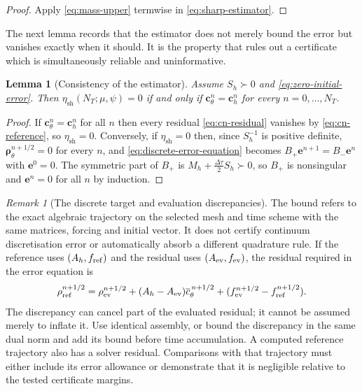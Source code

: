 \documentclass[11pt]{amsart}
\newtheorem{lemma}[theorem]{Lemma}
\theoremstyle{remark}
\newtheorem{remark}[theorem]{Remark}
\newcommand{\Mh}{M_h}
\newcommand{\Sh}{S_h}
\newcommand{\dt}{\Delta\tau}
\newcommand{\etaSharp}{\eta_{\mathrm{sh}}}
\newcommand{\ee}{\mathbf e}
\newcommand{\cc}{\mathbf c}
\newcommand{\rr}{\bm\rho}
\begin{document}
\begin{proof}
Apply \eqref{eq:mass-upper} termwise in \eqref{eq:sharp-estimator}.
\end{proof}

The next lemma records that the estimator does not merely bound the error but
vanishes exactly when it should.  It is the property that rules out a
certificate which is simultaneously reliable and uninformative.

\begin{lemma}[Consistency of the estimator]
\label{lem:consistency}
Assume $\Sh\succ0$ and \eqref{eq:zero-initial-error}. Then
$\etaSharp(N_T;\mu,\psi)=0$ if and only if $\cc_\theta^n=\cc_h^n$ for every
$n=0,\dots,N_T$.
\end{lemma}

\begin{proof}
If $\cc_\theta^n=\cc_h^n$ for all $n$ then every residual
\eqref{eq:cn-residual} vanishes by \eqref{eq:cn-reference}, so
$\etaSharp=0$.  Conversely, if $\etaSharp=0$ then, since $\Sh^{-1}$ is
positive definite, $\rr_\theta^{n+1/2}=0$ for every $n$, and
\eqref{eq:discrete-error-equation} becomes $B_+\ee^{n+1}=B_-\ee^n$ with
$\ee^0=0$.  The symmetric part of $B_+$ is
$\Mh+\tfrac{\dt}{2}\Sh\succ0$, so $B_+$ is nonsingular and
$\ee^{n}=0$ for all $n$ by induction.
\end{proof}

\begin{remark}[The discrete target and evaluation discrepancies]
\label{rem:scope-of-certificate}
The bound refers to the exact algebraic trajectory on the selected mesh and
time scheme with the same matrices, forcing and initial vector. It does not
certify continuum discretisation error or automatically absorb a different
quadrature rule. If the reference uses $(A_h,f_{\rm ref})$ and the residual
uses $(A_{\rm ev},f_{\rm ev})$, the residual required in the error equation is
\[
 \rho_{\rm ref}^{n+1/2}
 =\rho_{\rm ev}^{n+1/2}
  +(A_h-A_{\rm ev})\overline c_\theta^{\,n+1/2}
  +(f_{\rm ev}^{n+1/2}-f_{\rm ref}^{n+1/2}).
\]
The discrepancy can cancel part of the evaluated residual; it cannot be
assumed merely to inflate it. Use identical assembly, or bound the discrepancy
in the same dual norm and add its bound before time accumulation.
A computed reference trajectory also has a solver residual. Comparisons with
that trajectory must either include its error allowance or demonstrate that
it is negligible relative to the tested certificate margins.
\end{remark}
\end{document}
